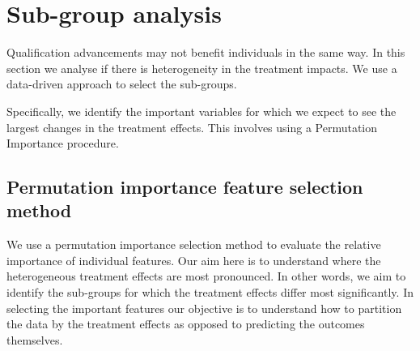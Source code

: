 \documentclass[12pt, a4paper]{article}
\begin{document}
%

\section{Sub-group analysis}

Qualification advancements may not benefit individuals in the same way. In this section we analyse if there is heterogeneity in the treatment impacts. We use a data-driven approach to select the sub-groups.  
%
%


Specifically, we identify the important variables for which we expect to see the largest changes in the treatment effects. This involves using a Permutation Importance procedure.




\subsection{Permutation importance feature selection method}

We use a permutation importance selection method \citep{breiman2001,molnar2020}
to evaluate the relative importance of individual features. Our aim here is to
understand where the heterogeneous treatment effects are most pronounced. In
other words, we aim to identify the sub-groups for which the treatment effects
differ most significantly. In selecting the important features our objective is
to understand how to partition the data by the treatment effects as opposed to
predicting the outcomes themselves. 
\end{document}
